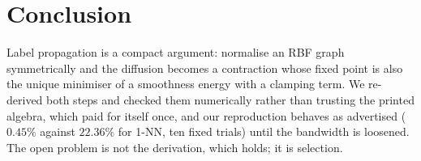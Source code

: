 \section{Conclusion}\label{sec:conclusion}

Label propagation is a compact argument: normalise an RBF graph symmetrically and
the diffusion becomes a contraction whose fixed point is also the unique minimiser
of a smoothness energy with a clamping term. We re-derived both steps and checked
them numerically rather than trusting the printed algebra, which paid for itself
once, and our reproduction behaves as advertised ($0.45\%$ against $22.36\%$ for
1-NN, ten fixed trials) until the bandwidth is loosened. The open problem is not
the derivation, which holds; it is selection.
